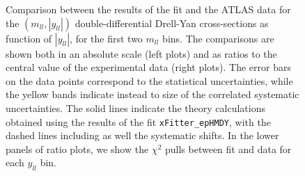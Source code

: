 \begin{figure}[t]
\caption{Comparison between the results of the fit and the ATLAS data
  for the $(m_{ll},|y_{ll}|)$ double-differential Drell-Yan cross-sections
  as function of $|y_{ll}|$, for the first two $m_{ll}$ bins.
  The comparisons are shown both
  in an absolute scale (left plots) and as ratios to the central value
  of the experimental data (right plots).
  The error bars on the data points correspond to the statistical
  uncertainties, while the yellow bands
  indicate instead to size of the correlated systematic uncertainties.
  The solid lines indicate the theory calculations obtained using the results
  of the fit {\tt xFitter\_epHMDY}, with the dashed lines including as well the systematic shifts.
  In the lower panels of ratio plots, we show the $\chi^2$ pulls between fit and data for each $y_{ll}$
  bin.
}
\label{hmDY_2D_1}
\end{figure}

